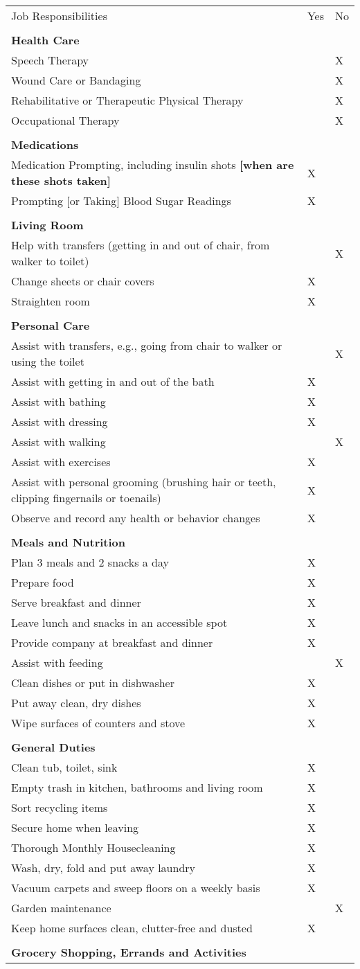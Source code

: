 \documentclass[]{article}
\begin{document}
\begin{longtable}[c]{@{}lll@{}}
\toprule
Job Responsibilities & Yes & No\tabularnewline
& &\tabularnewline
\textbf{Health Care} & &\tabularnewline
Speech Therapy & & X\tabularnewline
Wound Care or Bandaging & & X\tabularnewline
Rehabilitative or Therapeutic Physical Therapy & & X\tabularnewline
Occupational Therapy & & X\tabularnewline
& &\tabularnewline
\textbf{Medications} & &\tabularnewline
Medication Prompting, including insulin shots \textbf{{[}when are these
shots taken{]}} & X &\tabularnewline
Prompting {[}or Taking{]} Blood Sugar Readings & X &\tabularnewline
& &\tabularnewline
\textbf{Living Room} & &\tabularnewline
Help with transfers (getting in and out of chair, from walker to toilet)
& & X\tabularnewline
Change sheets or chair covers & X &\tabularnewline
Straighten room & X &\tabularnewline
& &\tabularnewline
\textbf{Personal Care} & &\tabularnewline
Assist with transfers, e.g., going from chair to walker or using the
toilet & & X\tabularnewline
Assist with getting in and out of the bath & X &\tabularnewline
Assist with bathing & X &\tabularnewline
Assist with dressing & X &\tabularnewline
Assist with walking & & X\tabularnewline
Assist with exercises & X &\tabularnewline
Assist with personal grooming (brushing hair or teeth, clipping
fingernails or toenails) & X &\tabularnewline
Observe and record any health or behavior changes & X &\tabularnewline
& &\tabularnewline
\textbf{Meals and Nutrition} & &\tabularnewline
Plan 3 meals and 2 snacks a day & X &\tabularnewline
Prepare food & X &\tabularnewline
Serve breakfast and dinner & X &\tabularnewline
Leave lunch and snacks in an accessible spot & X &\tabularnewline
Provide company at breakfast and dinner & X &\tabularnewline
Assist with feeding & & X\tabularnewline
Clean dishes or put in dishwasher & X &\tabularnewline
Put away clean, dry dishes & X &\tabularnewline
Wipe surfaces of counters and stove & X &\tabularnewline
& &\tabularnewline
\textbf{General Duties} & &\tabularnewline
Clean tub, toilet, sink & X &\tabularnewline
Empty trash in kitchen, bathrooms and living room & X &\tabularnewline
Sort recycling items & X &\tabularnewline
Secure home when leaving & X &\tabularnewline
Thorough Monthly Housecleaning & X &\tabularnewline
Wash, dry, fold and put away laundry & X &\tabularnewline
Vacuum carpets and sweep floors on a weekly basis & X &\tabularnewline
Garden maintenance & & X\tabularnewline
Keep home surfaces clean, clutter-free and dusted & X &\tabularnewline
& &\tabularnewline
\textbf{Grocery Shopping, Errands and Activities} & &\tabularnewline

\end{longtable}
\end{document}
